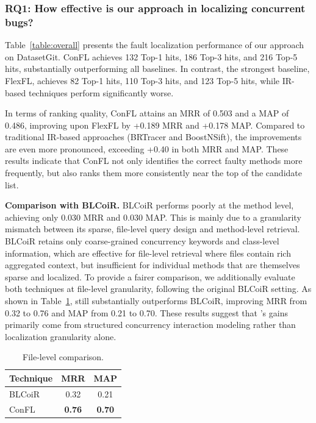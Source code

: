 \subsubsection{RQ1: How effective is our approach in localizing concurrent bugs?}

Table~\ref{table:overall} presents the fault localization performance of our approach on DatasetGit.
ConFL achieves 132 Top-1 hits, 186 Top-3 hits, and 216 Top-5 hits, substantially outperforming all baselines.
In contrast, the strongest baseline, FlexFL, achieves 82 Top-1 hits, 110 Top-3 hits, and 123 Top-5 hits, while IR-based techniques perform significantly worse.

In terms of ranking quality, ConFL attains an MRR of 0.503 and a MAP of 0.486, improving upon FlexFL by +0.189 MRR and +0.178 MAP.
Compared to traditional IR-based approaches (BRTracer and BoostNSift), the improvements are even more pronounced, exceeding +0.40 in both MRR and MAP.
These results indicate that ConFL not only identifies the correct faulty methods more frequently, but also ranks them more consistently near the top of the candidate list.



\noindent
\textbf{Comparison with BLCoiR.} BLCoiR performs poorly at the method level, achieving only 0.030 MRR and 0.030 MAP. This is mainly due to a granularity mismatch between its sparse, file-level query design and method-level retrieval. BLCoiR retains only coarse-grained concurrency keywords and class-level information, which are effective for file-level retrieval where files contain rich aggregated context, but insufficient for individual methods that are themselves sparse and localized. To provide a fairer comparison, we additionally evaluate both techniques at file-level granularity, following the original BLCoiR setting. As shown in Table~\ref{tab:file}, \Name{} still substantially outperforms BLCoiR, improving MRR from 0.32 to 0.76 and MAP from 0.21 to 0.70. These results suggest that \Name{}'s gains primarily come from structured concurrency interaction modeling rather than localization granularity alone.

\begin{table} \footnotesize
\vspace{-10pt}
\centering 
\caption{File-level comparison.}
\vspace{-8pt}
\label{tab:file}
\begin{tabular}{lcc}
\toprule
Technique & MRR & MAP \\
\midrule
BLCoiR & 0.32 & 0.21 \\
ConFL & \textbf{0.76} & \textbf{0.70} \\
\bottomrule
\end{tabular}
\vspace{-10pt}
\end{table}

